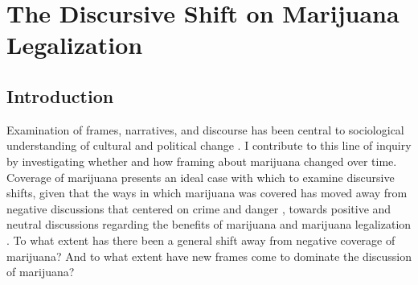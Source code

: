 
\chapter{The Discursive Shift on Marijuana Legalization}







\section{Introduction}


Examination of frames, narratives, and discourse has been central to sociological understanding of cultural and political change \citep{ghaziani_and_baldassarri_2011,vasi_et_al_2015,bail_2012,mccammon_et_al_2007}. I contribute to this line of inquiry by investigating whether and how framing about marijuana changed over time. Coverage of marijuana presents an ideal case with which to examine discursive shifts, given that the ways in which marijuana was covered has moved away from negative discussions that centered on crime and danger \citep{newhart_and_dolphin_2018,bonnie_and_whitebread_1970,rosenthal_and_kubby_1996}, towards positive and neutral discussions regarding the benefits of marijuana and marijuana legalization \citep{mosher_and_akins_2019}. To what extent has there been a general shift away from negative coverage of marijuana? And to what extent have new frames come to dominate the discussion of marijuana? 


